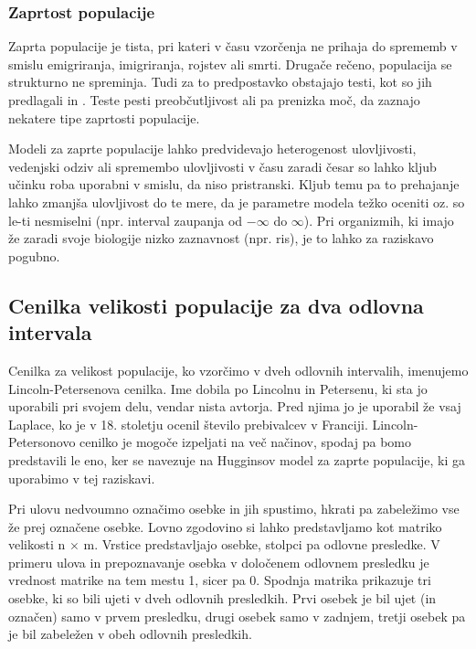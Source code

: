 \subsubsection{Zaprtost populacije}
Zaprta populacije je tista, pri kateri v času vzorčenja ne prihaja do sprememb v smislu emigriranja, imigriranja, rojstev ali smrti. Drugače rečeno, populacija se strukturno ne spreminja.
Tudi za to predpostavko obstajajo testi, kot so jih predlagali \citet{otis_statistical_1978} in \citet{stanley_closure_1999}. Teste pesti preobčutljivost ali pa prenizka moč, da zaznajo nekatere tipe zaprtosti populacije.

Modeli za zaprte populacije lahko predvidevajo heterogenost ulovljivosti, vedenjski odziv ali spremembo ulovljivosti v času \citep{otis_statistical_1978} zaradi česar so lahko kljub učinku roba uporabni v smislu, da niso pristranski. Kljub temu pa to prehajanje lahko zmanjša ulovljivost do te mere, da je parametre modela težko oceniti oz. so le-ti nesmiselni (npr. interval zaupanja od $-\infty$ do $\infty$). Pri organizmih, ki imajo že zaradi svoje biologije nizko zaznavnost (npr. ris), je to lahko za raziskavo pogubno.

\subsection{Cenilka velikosti populacije za dva odlovna intervala}
Cenilka za velikost populacije, ko vzorčimo v dveh odlovnih intervalih, imenujemo Lincoln-Petersenova cenilka. Ime dobila po Lincolnu in Petersenu, ki sta jo uporabili pri svojem delu, vendar nista avtorja. Pred njima jo je uporabil že vsaj Laplace, ko je v 18. stoletju ocenil število prebivalcev v Franciji. Lincoln-Petersonovo cenilko je mogoče izpeljati na več načinov, spodaj pa bomo predstavili le eno, ker se navezuje na Hugginsov model za zaprte populacije, ki ga uporabimo v tej raziskavi.

Pri ulovu nedvoumno označimo osebke in jih spustimo, hkrati pa zabeležimo vse že prej označene osebke. Lovno zgodovino si lahko predstavljamo kot matriko velikosti n $\times$ m. Vrstice predstavljajo osebke, stolpci pa odlovne presledke. V primeru ulova in prepoznavanje osebka v določenem odlovnem presledku je vrednost matrike na tem mestu 1, sicer pa 0. Spodnja matrika prikazuje tri osebke, ki so bili ujeti v dveh odlovnih presledkih. Prvi osebek je bil ujet (in označen) samo v prvem presledku, drugi osebek samo v zadnjem, tretji osebek pa je bil zabeležen v obeh odlovnih presledkih.

